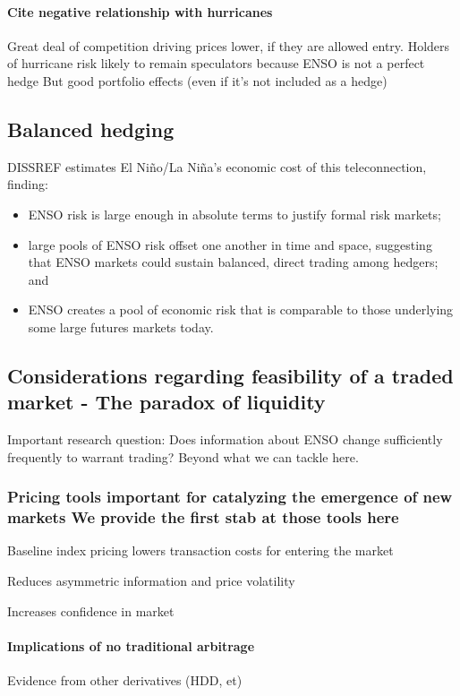 \documentclass[authoryear]{article}
\begin{document}
\paragraph{Cite negative relationship with hurricanes}
Great deal of competition driving prices lower, if they are allowed entry.
Holders of hurricane risk likely to remain speculators because ENSO is not a perfect hedge 
But good portfolio effects (even if it's not included as a hedge)


\subsection{Balanced hedging}

DISSREF estimates El Ni\~no/La Ni\~na's economic cost of this teleconnection, finding:
\begin{itemize} 
\item ENSO risk is large enough in absolute terms to justify formal risk markets;
\item large pools of ENSO risk offset one another in time and space, suggesting that ENSO markets could sustain balanced, direct trading among hedgers; and 
\item ENSO creates a pool of economic risk that is comparable to those underlying some large futures markets today.
\end{itemize}

\subsection{Considerations regarding feasibility of a traded market - The paradox of liquidity}
Important research question: Does information about ENSO change sufficiently frequently to warrant trading? Beyond what we can tackle here.

\subsubsection{Pricing tools important for catalyzing the emergence of new markets
We provide the first stab at those tools here}

Baseline index pricing lowers transaction costs for entering the market

Reduces asymmetric information and price volatility

Increases confidence in market

\paragraph{Implications of no traditional arbitrage}
Evidence from other derivatives (HDD, et)
\end{document}
